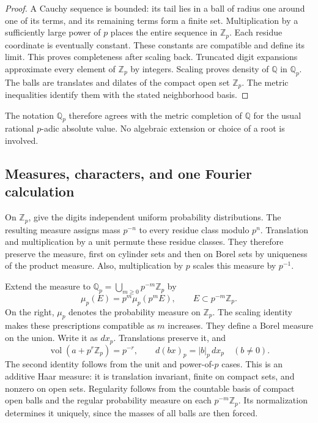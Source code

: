 \begin{proof}
A Cauchy sequence is bounded: its tail lies in a ball of radius one around
one of its terms, and its remaining terms form a finite set.
Multiplication by a sufficiently large power of \(p\) places the entire
sequence in \(\mathbb Z_p\). Each residue coordinate is eventually constant.
These constants are compatible and define its limit. This proves
completeness after scaling back. Truncated digit expansions approximate
every element of \(\mathbb Z_p\) by integers. Scaling proves density of
\(\mathbb Q\) in \(\mathbb Q_p\). The balls are translates and dilates of the
compact open set \(\mathbb Z_p\). The metric inequalities identify them with the
stated neighborhood basis.
\end{proof}

The notation \(\mathbb Q_p\) therefore agrees with the metric completion
of \(\mathbb Q\) for the usual rational \(p\)-adic absolute value.
No algebraic extension or choice of a root is involved.

\subsection{Measures, characters, and one Fourier calculation}
\label{sec:adeles-local-fourier}

On \(\mathbb Z_p\), give the digits independent uniform probability distributions.
The resulting measure assigns mass \(p^{-n}\) to every residue class modulo
\(p^n\). Translation and multiplication by a unit permute these residue
classes. They therefore preserve the measure, first on cylinder sets and
then on Borel sets by uniqueness of the product measure.
Also, multiplication by \(p\) scales this measure by \(p^{-1}\).

Extend the measure to \(\mathbb Q_p=\bigcup_{m\geq0}p^{-m}\mathbb Z_p\) by
\[
 \mu_p(E)=p^m\mu_p(p^mE),\qquad E\subset p^{-m}\mathbb Z_p.
\]
On the right, \(\mu_p\) denotes the probability measure on \(\mathbb Z_p\).
The scaling identity makes these prescriptions compatible as \(m\)
increases. They define a Borel measure on the union. Write it as \(dx_p\).
Translations preserve it, and
\begin{equation}
 \operatorname{vol}(a+p^r\mathbb Z_p)=p^{-r},\qquad
 d(bx)_p=|b|_p\,dx_p\quad(b\neq0).
 \label{eq:adeles-additive-scaling}
\end{equation}
The second identity follows from the unit and power-of-\(p\) cases.
This is an additive Haar measure: it is translation invariant, finite on
compact sets, and nonzero on open sets. Regularity follows from the
countable basis of compact open balls and the regular probability measure
on each \(p^{-m}\mathbb Z_p\). Its normalization determines it uniquely, since
the masses of all balls are then forced.


